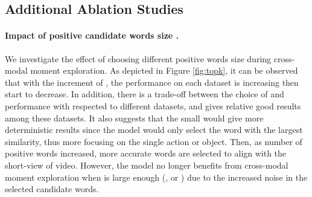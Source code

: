 \documentclass[10pt,twocolumn,letterpaper]{article}
\begin{document}
\subsection{Additional Ablation Studies}

\paragraph{Impact of positive candidate words size .}
We investigate the effect of choosing different positive words size  during cross-modal moment exploration. As depicted in Figure \ref{fig:topk}, it can be observed that with the increment of , the performance on each dataset is increasing then start to decrease. In addition, there is a trade-off between the choice of  and performance with respected to different datasets, and  gives relative good results among these datasets. It also suggests that the small  would give more deterministic results since the model would only select the word with the largest similarity, thus more focusing on the single action or object. Then, as number of positive words increased, more accurate words are selected to align with the short-view of video. However, the model no longer benefits from cross-modal moment exploration when  is large enough (\ie,  or ) due to the increased noise in the selected candidate words.
\end{document}
